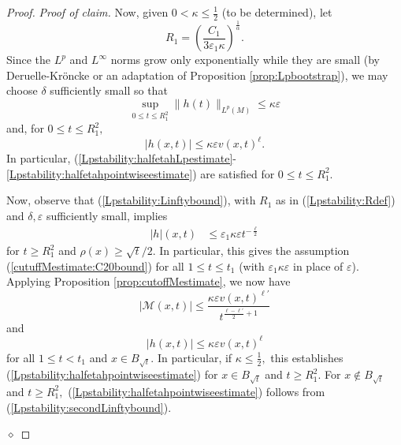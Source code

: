 \documentclass[12pt]{amsart}
\newcommand{\calM}{\mathcal{M}}
\renewcommand{\1}{{\mathbf 1}}
\newcommand{\eps}{{\varepsilon}}
\newenvironment{claimproof}{\par\noindent\textit{Proof of claim.}\space}{\hfill$\diamond$\medskip\par}
\theoremstyle{others}
\numberwithin{equation}{section}
\begin{document}
\begin{proof}
\begin{claimproof}
Now, given $0 < \kappa \leq \frac12 $ (to be determined), let 
\begin{equation}\label{Lpstability:Rdef}
R_1 = \left(\frac{C_1}{3 \eps_1 \kappa } \right)^{\frac{1}{\alpha}}. %
\end{equation}
Since the $L^p$ and $L^\infty$ norms grow only exponentially while they are small (by Deruelle-Kr{\"o}ncke \cite[Lemma 3.3]{DeruelleKroncke20} or an adaptation of Proposition \ref{prop:Lpbootstrap}), we may choose $\delta$ sufficiently small so that
    \begin{equation}\label{Lpstability:kappaetahLpestimate}
        \sup_{0 \leq t \leq R_1^2} \| h(t) \|_{L^p(M)} \leq \kappa \eps
    \end{equation}
    and, for $0 \leq t \leq R_1^2,$
          \begin{equation}\label{Lpstability:kappaetahpointwiseestimate}
       | h(x,t) | \leq \kappa \eps v(x,t)^{\ell}.
    \end{equation}
    In particular, (\ref{Lpstability:halfetahLpestimate}-\ref{Lpstability:halfetahpointwiseestimate}) are satisfied for $0 \leq t \leq R_1^2.$
    
    Now, observe that (\ref{Lpstability:Linftybound}), with $R_1$ as in (\ref{Lpstability:Rdef}) and $\delta, \eps$ sufficiently small, implies
    \begin{equation}\label{Lpstability:secondLinftybound}
\begin{split}
    |h|(x,t) & \leq \eps_1 \kappa \eps t^{-\frac{\ell}{2}}
    \end{split}
\end{equation}
    for $t \geq R_1^2$ and $\rho(x) \geq \sqrt{t}/2.$ %
    In particular, this gives the assumption (\ref{cutuffMestimate:C20bound}) for all $1 \leq t \leq t_1$ (with $\eps_1 \kappa \eps$ in place of $\eps$). Applying Proposition \ref{prop:cutoffMestimate}, we now have
            \begin{equation}\label{Lpstability:secondMestimate}
        |\calM(x,t)| \leq \frac{ \kappa \eps v(x,t)^{\ell'}}{t^{\frac{\ell - \ell'}{2} + 1}}
    \end{equation}
    and
     \begin{equation}\label{Lpstability:gestimate}
        | h(x,t) | \leq \kappa \eps v(x,t)^\ell
    \end{equation}
    for all $1 \leq t < t_1$ and $x \in B_{\sqrt{t}}.$ In particular, if $\kappa \leq \frac12,$ this establishes (\ref{Lpstability:halfetahpointwiseestimate}) for $x \in B_{\sqrt{t}}$ and $t \geq R_1^2.$ For $x \not\in B_{\sqrt{t}}$ and $t \geq R_1^2,$ (\ref{Lpstability:halfetahpointwiseestimate}) follows from (\ref{Lpstability:secondLinftybound}).


\end{claimproof}
\end{proof}
\end{document}
